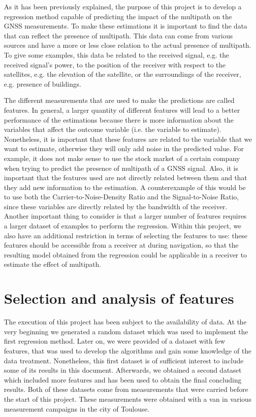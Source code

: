\documentclass[a4paper, report, oneside, UKenglish]{memoir}
\begin{document}
As it has been previously explained, the purpose of this project is to develop a regression method capable of predicting the impact of the multipath on the GNSS measurements. To make these estimations it is important to find the data that can reflect the presence of multipath.
This data can come from various sources and have a more or less close relation to the actual presence of multipath. To give some examples, this data be related to the received signal, e.g. the received signal's power, to the position of the receiver with respect to the satellites, e.g. the elevation of the satellite, or the surroundings of the receiver, e.g. presence of buildings. 

The different measurements that are used to make the predictions are called features. In general, a larger quantity of different features will lead to a better performance of the estimations because there is more information about the variables that affect the outcome variable (i.e. the variable to estimate). Nonetheless, it is important that these features are related to the variable that we want to estimate, otherwise they will only add noise in the predicted value. For example, it does not make sense to use the stock market of a certain company when trying to predict the presence of multipath of a GNSS signal. Also, it is important that the features used are not directly related between them and that they add new information to the estimation. A counterexample of this would be to use both the Carrier-to-Noise-Density Ratio and the Signal-to-Noise Ratio, since these variables are directly related by the bandwidth of the receiver. Another important thing to consider is that a larger number of features requires a larger dataset of examples to perform the regression. Within this project, we also have an additional restriction in terms of selecting the features to use: these features should be accessible from a receiver at during navigation, so that the resulting model obtained from the regression could be applicable in a receiver to estimate the effect of multipath.

\section{Selection and analysis of features}
The execution of this project has been subject to the availability of data. At the very beginning we generated a random dataset which was used to implement the first regression method. Later on, we were provided of a dataset with few features, that was used to develop the algorithms and gain some knowledge of the data treatment. Nonetheless, this first dataset is of sufficient interest to include some of its results in this document. Afterwards, we obtained a second dataset which included more features and has been used to obtain the final concluding results. Both of these datasets come from measurements that were carried before the start of this project. These measurements were obtained with a van in various measurement campaigns in the city of Toulouse.
\end{document}
